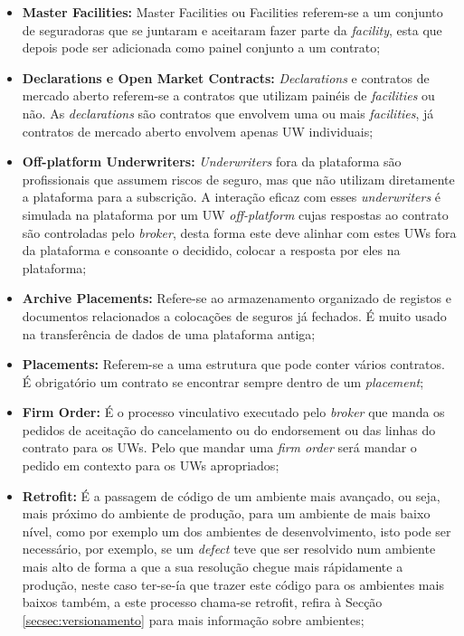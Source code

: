 \begin{itemize}
            \item \textbf{Master Facilities:} Master Facilities ou Facilities referem-se a um conjunto de seguradoras que se juntaram e aceitaram fazer parte da \textit{facility}, esta que depois pode ser adicionada como painel conjunto a um contrato;

            \item \textbf{Declarations e Open Market Contracts:} \textit{Declarations} e contratos de mercado aberto referem-se a contratos que utilizam painéis de \textit{facilities} ou não. As \textit{declarations} são contratos que envolvem uma ou mais \textit{facilities}, já contratos de mercado aberto envolvem apenas UW individuais;
            
            \item \textbf{Off-platform Underwriters:} \textit{Underwriters} fora da plataforma são profissionais que assumem riscos de seguro, mas que não utilizam diretamente a plataforma para a subscrição. A interação eficaz com esses \textit{underwriters} é simulada na plataforma por um UW \textit{off-platform} cujas respostas ao contrato são controladas pelo \textit{broker}, desta forma este deve alinhar com estes UWs fora da plataforma e consoante o decidido, colocar a resposta por eles na plataforma;
            
            \item \textbf{Archive Placements:} Refere-se ao armazenamento organizado de registos e documentos relacionados a colocações de seguros já fechados. É muito usado na transferência de dados de uma plataforma antiga;
            
            \item \textbf{Placements:} Referem-se a uma estrutura que pode conter vários contratos. É obrigatório um contrato se encontrar sempre dentro de um \textit{placement};
            
            \item \textbf{Firm Order:} É o processo vinculativo executado pelo \textit{broker} que manda os pedidos de aceitação do cancelamento ou do endorsement ou das linhas do contrato para os UWs. Pelo que mandar uma \textit{firm order} será mandar o pedido em contexto para os UWs apropriados;
            
            \item \textbf{Retrofit:} É a passagem de código de um ambiente mais avançado, ou seja, mais próximo do ambiente de produção, para um ambiente de mais baixo nível, como por exemplo um dos ambientes de desenvolvimento, isto pode ser necessário, por exemplo, se um \textit{defect} teve que ser resolvido num ambiente mais alto de forma a que a sua resolução chegue mais rápidamente a produção, neste caso ter-se-ía que trazer este código para os ambientes mais baixos também, a este processo chama-se retrofit, refira à Secção \ref{secsec:versionamento} para mais informação sobre ambientes;
            

\end{itemize}

